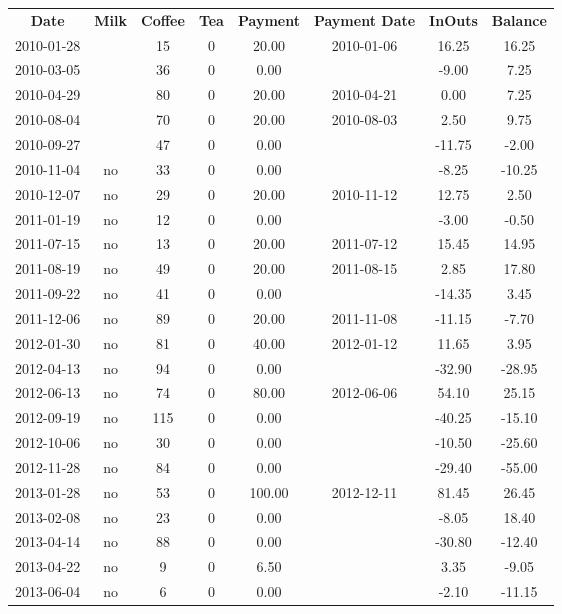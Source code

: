 \begin{center}
\begin{tabular}{cccccccc}
\textbf{Date} & \textbf{Milk} & \textbf{Coffee} & \textbf{Tea} & \textbf{Payment} & \textbf{Payment Date} & \textbf{InOuts} & \textbf{Balance} \\
2010-01-28 &  &  15 & 0 &  20.00 & 2010-01-06 &  16.25 &  16.25\\ 
2010-03-05 &  &  36 & 0 &   0.00 &  &  -9.00 &   7.25\\ 
2010-04-29 &  &  80 & 0 &  20.00 & 2010-04-21 &   0.00 &   7.25\\ 
2010-08-04 &  &  70 & 0 &  20.00 & 2010-08-03 &   2.50 &   9.75\\ 
2010-09-27 &  &  47 & 0 &   0.00 &  & -11.75 &  -2.00\\ 
2010-11-04 & no &  33 & 0 &   0.00 &  &  -8.25 & -10.25\\ 
2010-12-07 & no &  29 & 0 &  20.00 & 2010-11-12 &  12.75 &   2.50\\ 
2011-01-19 & no &  12 & 0 &   0.00 &  &  -3.00 &  -0.50\\ 
2011-07-15 & no &  13 & 0 &  20.00 & 2011-07-12 &  15.45 &  14.95\\ 
2011-08-19 & no &  49 & 0 &  20.00 & 2011-08-15 &   2.85 &  17.80\\ 
2011-09-22 & no &  41 & 0 &   0.00 &  & -14.35 &   3.45\\ 
2011-12-06 & no &  89 & 0 &  20.00 & 2011-11-08 & -11.15 &  -7.70\\ 
2012-01-30 & no &  81 & 0 &  40.00 & 2012-01-12 &  11.65 &   3.95\\ 
2012-04-13 & no &  94 & 0 &   0.00 &  & -32.90 & -28.95\\ 
2012-06-13 & no &  74 & 0 &  80.00 & 2012-06-06 &  54.10 &  25.15\\ 
2012-09-19 & no & 115 & 0 &   0.00 &  & -40.25 & -15.10\\ 
2012-10-06 & no &  30 & 0 &   0.00 &  & -10.50 & -25.60\\ 
2012-11-28 & no &  84 & 0 &   0.00 &  & -29.40 & -55.00\\ 
2013-01-28 & no &  53 & 0 & 100.00 & 2012-12-11 &  81.45 &  26.45\\ 
2013-02-08 & no &  23 & 0 &   0.00 &  &  -8.05 &  18.40\\ 
2013-04-14 & no &  88 & 0 &   0.00 &  & -30.80 & -12.40\\ 
2013-04-22 & no &   9 & 0 &   6.50 &  &   3.35 &  -9.05\\ 
2013-06-04 & no &   6 & 0 &   0.00 &  &  -2.10 & -11.15
\end{tabular}
\end{center}

